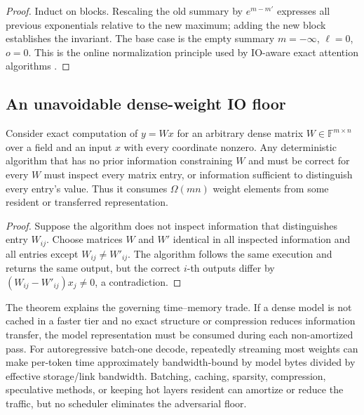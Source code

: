 \begin{proof}
Induct on blocks. Rescaling the old summary by $e^{m-m'}$ expresses all previous exponentials relative to the new maximum; adding the new block establishes the invariant. The base case is the empty summary $m=-\infty$, $\ell=0$, $o=0$. This is the online normalization principle used by IO-aware exact attention algorithms \cite{milakov2018online,dao2022flashattention}.
\end{proof}

\subsection{An unavoidable dense-weight IO floor}

\begin{theorem}
\label{thm:dense-lower-bound}
Consider exact computation of $y=Wx$ for an arbitrary dense matrix $W\in\mathbb F^{m\times n}$ over a field and an input $x$ with every coordinate nonzero. Any deterministic algorithm that has no prior information constraining $W$ and must be correct for every $W$ must inspect every matrix entry, or information sufficient to distinguish every entry's value. Thus it consumes $\Omega(mn)$ weight elements from some resident or transferred representation.
\end{theorem}

\begin{proof}
Suppose the algorithm does not inspect information that distinguishes entry $W_{ij}$. Choose matrices $W$ and $W'$ identical in all inspected information and all entries except $W_{ij}\ne W'_{ij}$. The algorithm follows the same execution and returns the same output, but the correct $i$-th outputs differ by $(W_{ij}-W'_{ij})x_j\ne0$, a contradiction.
\end{proof}

The theorem explains the governing time--memory trade. If a dense model is not cached in a faster tier and no exact structure or compression reduces information transfer, the model representation must be consumed during each non-amortized pass. For autoregressive batch-one decode, repeatedly streaming most weights can make per-token time approximately bandwidth-bound by model bytes divided by effective storage/link bandwidth. Batching, caching, sparsity, compression, speculative methods, or keeping hot layers resident can amortize or reduce the traffic, but no scheduler eliminates the adversarial floor.

